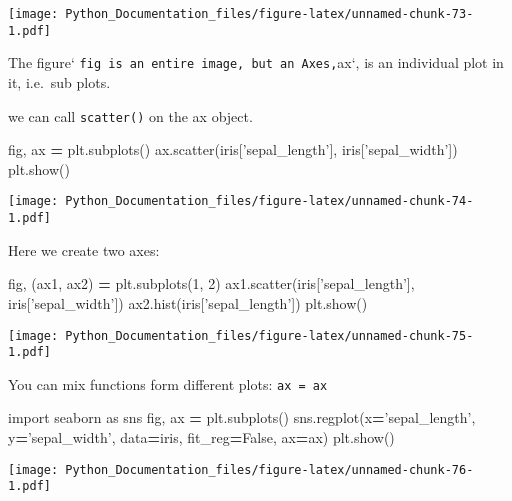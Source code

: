 \documentclass[]{book}
\newenvironment{Shaded}{\begin{snugshade}}{\end{snugshade}}
\newcommand{\DecValTok}[1]{\textcolor[rgb]{0.00,0.00,0.81}{#1}}
\newcommand{\ImportTok}[1]{#1}
\newcommand{\NormalTok}[1]{#1}
\newcommand{\OperatorTok}[1]{\textcolor[rgb]{0.81,0.36,0.00}{\textbf{#1}}}
\newcommand{\StringTok}[1]{\textcolor[rgb]{0.31,0.60,0.02}{#1}}
\newcommand{\VariableTok}[1]{\textcolor[rgb]{0.00,0.00,0.00}{#1}}
\theoremstyle{definition}
\theoremstyle{definition}
\theoremstyle{definition}
\theoremstyle{remark}
\begin{document}
\texttt{[image: Python\_Documentation\_files/figure-latex/unnamed-chunk-73-1.pdf]}

The figure`
\texttt{fig\textasciigrave{}\textasciigrave{}\ is\ an\ entire\ image,\ but\ an\ Axes,}ax`,
is an individual plot in it, i.e.~sub plots.

we can call \texttt{scatter()} on the ax object.

\begin{Shaded}
\begin{Highlighting}[]
\NormalTok{fig, ax }\OperatorTok{=}\NormalTok{ plt.subplots()}
\NormalTok{ax.scatter(iris[}\StringTok{'sepal_length'}\NormalTok{], iris[}\StringTok{'sepal_width'}\NormalTok{])}
\NormalTok{plt.show()}
\end{Highlighting}
\end{Shaded}

\texttt{[image: Python\_Documentation\_files/figure-latex/unnamed-chunk-74-1.pdf]}

Here we create two axes:

\begin{Shaded}
\begin{Highlighting}[]
\NormalTok{fig, (ax1, ax2) }\OperatorTok{=}\NormalTok{ plt.subplots(}\DecValTok{1}\NormalTok{, }\DecValTok{2}\NormalTok{)}
\NormalTok{ax1.scatter(iris[}\StringTok{'sepal_length'}\NormalTok{], iris[}\StringTok{'sepal_width'}\NormalTok{])}
\NormalTok{ax2.hist(iris[}\StringTok{'sepal_length'}\NormalTok{])}
\NormalTok{plt.show()}
\end{Highlighting}
\end{Shaded}

\texttt{[image: Python\_Documentation\_files/figure-latex/unnamed-chunk-75-1.pdf]}

You can mix functions form different plots: \texttt{ax\ =\ ax}

\begin{Shaded}
\begin{Highlighting}[]
\ImportTok{import}\NormalTok{ seaborn }\ImportTok{as}\NormalTok{ sns}
\NormalTok{fig, ax }\OperatorTok{=}\NormalTok{ plt.subplots()}
\NormalTok{sns.regplot(x}\OperatorTok{=}\StringTok{'sepal_length'}\NormalTok{, y}\OperatorTok{=}\StringTok{'sepal_width'}\NormalTok{,}
\NormalTok{            data}\OperatorTok{=}\NormalTok{iris, fit_reg}\OperatorTok{=}\VariableTok{False}\NormalTok{, ax}\OperatorTok{=}\NormalTok{ax)}
\NormalTok{plt.show()}
\end{Highlighting}
\end{Shaded}

\texttt{[image: Python\_Documentation\_files/figure-latex/unnamed-chunk-76-1.pdf]}
\end{document}
